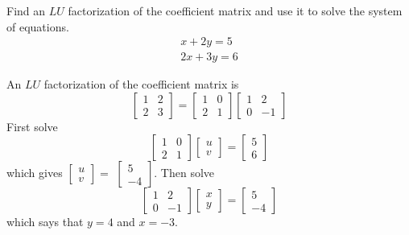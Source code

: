 \documentclass{ximera}
\begin{document}
\begin{problem}\label{prb:4.70} Find an $LU$ factorization of the coefficient matrix and use it to solve the system of equations.
\begin{equation*}
\begin{array}{c}
x+2y=5 \\
2x+3y=6
\end{array}
\end{equation*}
\begin{hint}
An $LU$ factorization of the coefficient matrix is
\[
\left[
\begin{array}{cc}
1 & 2 \\
2 & 3
\end{array}
\right] =  \left[
\begin{array}{cc}
1 & 0 \\
2 & 1
\end{array}
\right] \left[
\begin{array}{cc}
1 & 2 \\
0 & -1
\end{array}
\right]
\]
First solve
\[
\left[
\begin{array}{cc}
1 & 0 \\
2 & 1
\end{array}
\right] \left[
\begin{array}{c}
u \\
v
\end{array}
\right] =\left[
\begin{array}{c}
5 \\
6
\end{array}
\right]
\]
which gives $\left[
\begin{array}{c}
u \\
v
\end{array}
\right] =$ $\left[
\begin{array}{r}
5 \\
-4
\end{array}
\right] .$ Then solve
\[
\left[
\begin{array}{rr}
1 & 2 \\
0 & -1
\end{array}
\right] \left[
\begin{array}{c}
x \\
y
\end{array}
\right] =\left[
\begin{array}{r}
5 \\
-4
\end{array}
\right]
\]
which says that $y=4$ and $x=-3.$
\end{hint}
\end{problem}
\end{document}
